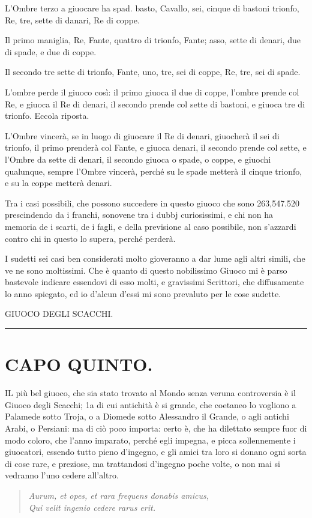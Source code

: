 \documentclass[11pt,a6paper]{article}
\newcommand{\literaryquote}[1]{%
\kern -6pt  \begin{verse}
    {\footnotesize \it #1}
  \end{verse}\kern -2pt%
}
\newcommand{\supersection}[1]{%
\clearpage
    {\scshape \centering \huge #1\\}
    \vspace{6pt}
    \hrule
    \vspace{12pt}
}
\begin{document}
L'Ombre terzo a giuocare ha spad. basto,
Cavallo, sei, cinque di bastoni trionfo,
Re, tre, sette di danari, Re di coppe.

Il primo maniglia, Re, Fante, quattro di
trionfo, Fante; asso, sette di denari, due di
spade, e due di coppe.

Il secondo tre sette di trionfo, Fante,
uno, tre, sei di coppe, Re, tre, sei di spade.

L'ombre perde il giuoco così: il primo
giuoca il due di coppe, l'ombre prende col
Re, e giuoca il Re di denari, il secondo
prende col sette di bastoni, e giuoca tre di
trionfo. Eccola riposta.

L'Ombre vincerà, se in luogo di giuocare
il Re di denari, giuocherà il sei di trionfo,
il primo prenderà col Fante, e giuoca denari,
il secondo prende col sette, e l'Ombre da
sette di denari, il secondo giuoca o spade, o
coppe, e giuochi qualunque, sempre l'Ombre
vincerà, perché su le spade metterà il cinque
trionfo, e su la coppe metterà denari.

Tra i casi possibili, che possono succedere
in questo giuoco che sono 263,547.520 prescindendo
da i franchi, sonovene tra i dubbj
curiosissimi, e chi non ha memoria de i scarti,
de i fagli, e della previsione al caso possibile,
non s'azzardi contro chi in questo lo supera,
perché perderà.

I sudetti sei casi ben considerati molto
gioveranno a dar lume agli altri simili, che ve
ne sono moltissimi. Che è quanto di questo
nobilissimo Giuoco mi è parso bastevole indicare
essendovi di esso molti, e gravissimi
Scrittori, che diffusamente lo anno spiegato,
ed io d'alcun d'essi mi sono prevaluto per le
cose sudette.


\supersection{GIUOCO DEGLI SCACCHI.}
\section{CAPO QUINTO.}

\lettrine{I}L più bel giuoco, che sia stato trovato al
Mondo senza veruna controversia è il
Giuoco degli Scacchi; 1a di cui antichità è
si grande, che coetaneo lo vogliono a Palamede
sotto Troja, o a Diomede sotto Alessandro
il Grande, o agli antichi Arabi, o Persiani:
ma di ciò poco importa: certo è, che
ha dilettato sempre fuor di modo coloro, che
l'anno imparato, perché egli impegna, e picca
sollennemente i giuocatori, essendo tutto
pieno d'ingegno, e gli amici tra loro si donano
ogni sorta di cose rare, e preziose, ma
trattandosi d'ingegno poche volte, o non mai
si vedranno l'uno cedere all'altro.
\literaryquote{
 Aurum, et opes, et rara frequens donabis amicus,\\
 Qui velit ingenio cedere rarus erit.}
\end{document}

